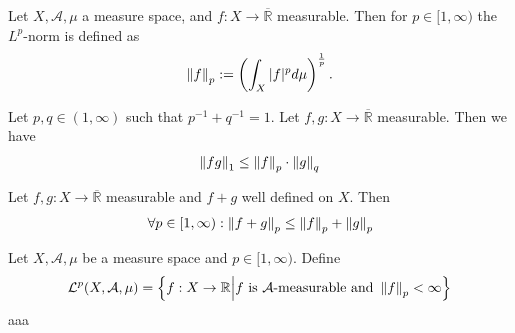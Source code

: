 \begin{definition}[\(L^p\)-Norm]
    Let \(X, \mathcal{A}, \mu\) a measure space, and \(f: X \rightarrow \overline{\mathbb{R}}\) measurable. Then for \(p \in [1, \infty)\) the \(L^p\)-norm is defined as
    \begin{align}
        \left\lVert f\right\rVert_p := \left( \int_X |f|^p d\mu \right)^{\frac{1}{p}} \text{.}
    \end{align}
\end{definition}
%
\begin{theorem}
    Let \(p, q \in (1, \infty)\) such that \(p^{-1} + q^{-1} =1\). Let \(f, g: X \rightarrow \overline{\mathbb{R}}\) measurable. Then we have
    \begin{align}
        \left\lVert fg\right\rVert_1 \leq \left\lVert f\right\rVert_p \cdot \left\lVert g\right\rVert_q
    \end{align}
\end{theorem}
%
\begin{theorem}
    Let \(f, g: X \rightarrow \overline{\mathbb{R}}\) measurable and \(f + g\) well defined on \(X\). Then
    \begin{align}
        \forall p \in [1, \infty) : \left\lVert f + g\right\rVert_p \leq \left\lVert f\right\rVert_p + \left\lVert g\right\rVert_p
    \end{align}
\end{theorem}
\begin{definition}
    Let \(X, \mathcal{A}, \mu\) be a measure space and \(p \in [1, \infty)\). Define
    \begin{align}
        \mathcal{L}^p(X, \mathcal{A}, \mu) = \left\{f: X \rightarrow \mathbb{R} \middle| f \text{ is \(\mathcal{A}\)-measurable and } \left\lVert f\right\rVert_p < \infty \right\}
    \end{align}
    aaa

\end{definition}